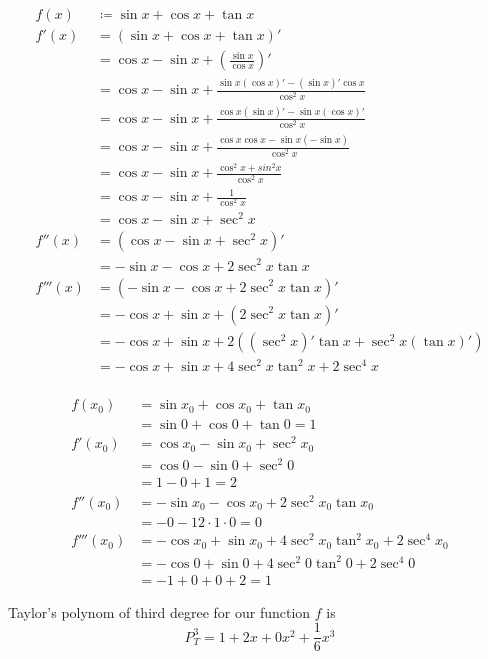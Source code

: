 \begin{align}
    f(x) &\coloneq \sin{x} + \cos{x} + \tan{x} \\
    f'(x) &= \left( \sin{x} + \cos{x} + \tan{x} \right)' \\
    &= \cos{x} -\sin{x} + \left( \frac{\sin{x}}{\cos{x}} \right)' \\
    &= \cos{x} -\sin{x} + \frac{\sin{x}(\cos{x})' - (\sin{x})'\cos{x}}{\cos^2{x}} \\
    &= \cos{x} -\sin{x} + \frac{\cos{x}(\sin{x})' - \sin{x}(\cos{x})'}{\cos^2{x}} \\
    &= \cos{x} -\sin{x} + \frac{\cos{x}\cos{x} - \sin{x}(-\sin{x})}{\cos^2{x}} \\
    &= \cos{x} -\sin{x} + \frac{\cos^2{x} + sin^2{x}}{\cos^2{x}} \\
    &= \cos{x} -\sin{x} + \frac{1}{\cos^2{x}} \\
    &= \cos{x} -\sin{x} + \sec^2{x} \\
    f''(x) &= \left( \cos{x} -\sin{x} + \sec^2{x} \right)' \\ 
    &= -\sin{x} - \cos{x} + 2\sec^2{x}\tan{x} \\
    f'''(x) &= \left( -\sin{x} - \cos{x} + 2\sec^2{x}\tan{x} \right)' \\
    &= -\cos{x} + \sin{x} + \left( 2\sec^2{x}\tan{x} \right)' \\
    &= -\cos{x} + \sin{x} + 2\left( (\sec^2{x})'\tan{x} + \sec^2{x}(\tan{x})' \right) \\
    &= -\cos{x} + \sin{x} + 4\sec^2{x}\tan^2{x} + 2\sec^4{x} \\
\end{align}

\begin{align}
    f(x_0) &= \sin{x_0} + \cos{x_0} + \tan{x_0} \\
    &= \sin{0} + \cos{0} + \tan{0} = 1 \\
    f'(x_0) &= \cos{x_0} - \sin{x_0} + \sec^2{x_0} \\
    &= \cos{0} - \sin{0} + \sec^2{0} \\ 
    &= 1 - 0 + 1 = 2 \\
    f''(x_0) &= -\sin{x_0} - \cos{x_0} + 2\sec^2{x_0}\tan{x_0} \\
    &= - 0 - 1 2 \cdot 1 \cdot 0 = 0 \\
    f'''(x_0) &= -\cos{x_0} + \sin{x_0} + 4\sec^2{x_0}\tan^2{x_0} + 2\sec^4{x_0} \\ 
    &= -\cos{0} + \sin{0} + 4\sec^2{0}\tan^2{0} + 2\sec^4{0} \\ 
    &= - 1 + 0 + 0 + 2 = 1 
\end{align}

Taylor's polynom of third degree for our function $f$ is 
$$
    P^3_T = 1 + 2x + 0x^2 + \frac{1}{6}x^3
$$